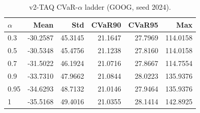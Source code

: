 \begin{table}[H]
    \centering
    \caption{v2-TAQ CVaR-$\alpha$ ladder (GOOG, seed 2024).}
    \label{tab:v2_taq_alpha}
    \begin{tabular}{@{}lrrrrr@{}}
        \toprule
        $\alpha$ & Mean & Std & CVaR90 & CVaR95 & Max \\
        \midrule
        0.3 & -30.2587 & 45.3145 & 21.1647 & 27.7969 & 114.0158 \\
        0.5 & -30.5348 & 45.4756 & 21.1238 & 27.8160 & 114.0158 \\
        0.7 & -31.5022 & 46.1924 & 21.0716 & 27.8667 & 114.7554 \\
        0.9 & -33.7310 & 47.9662 & 21.0844 & 28.0223 & 135.9376 \\
        0.95 & -34.6293 & 48.7132 & 21.0146 & 27.9464 & 135.9376 \\
        1 & -35.5168 & 49.4016 & 21.0355 & 28.1414 & 142.8925 \\
        \bottomrule
    \end{tabular}
\end{table}
